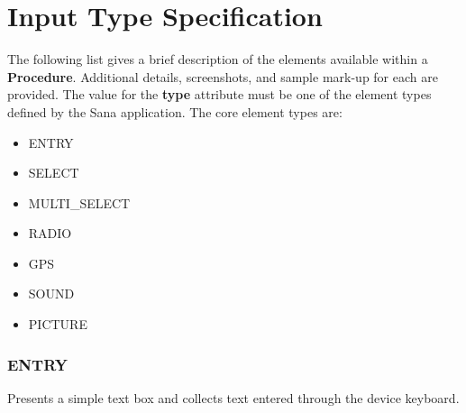 \documentclass[a4paper,10pt]{article}
\begin{document}
\section{Input Type Specification}
The following list gives a brief description of the elements available within a
\textbf{Procedure}. Additional details, screenshots, and sample mark-up for each
are provided. The value for the \textbf{type} attribute must be one
of the element types defined by the Sana application. The core element types 
are:

\begin{itemize}
 \item ENTRY
 \item SELECT
 \item MULTI\_SELECT
 \item RADIO
 \item GPS
 \item SOUND
 \item PICTURE 
\end{itemize}

\subsubsection{ENTRY} Presents a simple text box and collects text entered 
through the device keyboard.
\end{document}
